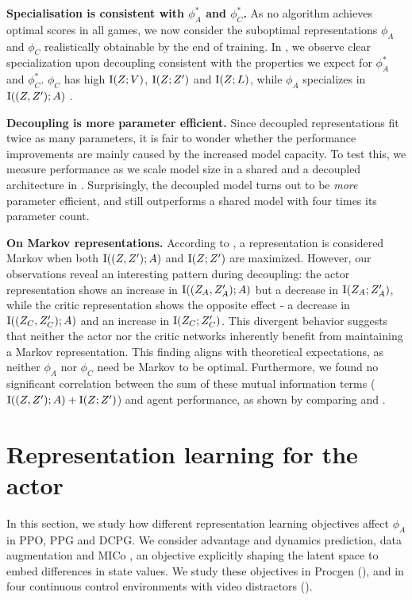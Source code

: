 \textbf{Specialisation is consistent with $\phi^*_A$ and $\phi^*_C$.} As no algorithm achieves optimal scores in all games, we now consider the suboptimal representations $\phi_A$ and $\phi_C$ realistically obtainable by the end of training. In , we observe clear specialization upon decoupling consistent with the properties we expect for $\phi^*_A$ and $\phi^*_C$. $\phi_C$ has high $\text{I}(Z;V)$, $\text{I}(Z;Z')$ and $\text{I}(Z;L)$, while $\phi_A$ specializes in $\text{I}((Z,Z');A)$ .

\textbf{Decoupling is more parameter efficient.} Since decoupled representations fit twice as many parameters, it is fair to wonder whether the performance improvements are mainly caused by the increased model capacity. To test this, we measure performance as we scale model size in a shared and a decoupled architecture in . Surprisingly, the decoupled model turns out to be \textit{more} parameter efficient, and still outperforms a shared model with four times its parameter count.

\textbf{On Markov representations.}
According to , a representation is considered Markov when both $\text{I}((Z,Z');A)$ and $\text{I}(Z;Z')$ are maximized. However, our observations reveal an interesting pattern during decoupling: the actor representation shows an increase in $\text{I}((Z_A,Z_A');A)$ but a decrease in $\text{I}(Z_A;Z_A')$, while the critic representation shows the opposite effect - a decrease in $\text{I}((Z_C,Z_C');A)$ and an increase in $\text{I}(Z_C;Z_C')$. This divergent behavior suggests that neither the actor nor the critic networks inherently benefit from maintaining a Markov representation. This finding aligns with theoretical expectations, as neither $\phi_A$ nor $\phi_C$ need be Markov to be optimal. Furthermore, we found no significant correlation between the sum of these mutual information terms ($\text{I}((Z,Z');A) + \text{I}(Z;Z')$) and agent performance, as shown by comparing  and .
%
\section{Representation learning for the actor}
%
In this section, we study how different representation learning objectives affect $\phi_A$ in PPO, PPG and DCPG. We consider advantage \citep{raileanu2021decoupling} and dynamics \citep{DCPG} prediction, data augmentation \citep{raileanu2021UCB-DrAC} and MICo \citep{MICo}, an objective explicitly shaping the latent space to embed differences in state values. We study these objectives in Procgen (), and in four continuous control environments with video distractors \citep{mcinroe2025pixelbrax}(). 

